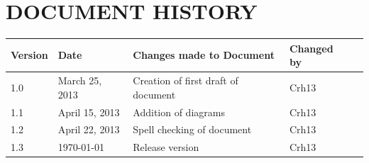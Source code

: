 \documentclass[a4paper]{article}
\begin{document}
\section{DOCUMENT HISTORY}

\begin{tabular}{|l | l | l | l | l |}

\hline

Version & Date & Changes made to Document & Changed by \\

\hline
1.0  & March 25, 2013 & Creation of first draft of document & Crh13\\
1.1  & April 15, 2013 & Addition of diagrams & Crh13\\
1.2  & April 22, 2013 & Spell checking of document & Crh13\\
1.3  & \today & Release version & Crh13\\
\hline


\end{tabular}
\end{document}
